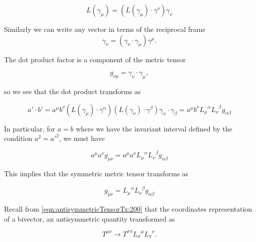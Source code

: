 \begin{equation}\label{eqn:antisymmetricTensorTx:330}
L(\gamma_\mu) = \left( L(\gamma_\mu) \cdot \gamma^\nu \right) \gamma_\nu
\end{equation}

Similarly we can write any vector in terms of the reciprocal frame
\begin{equation}\label{eqn:antisymmetricTensorTx:340}
\gamma_\nu = (\gamma_\nu \cdot \gamma_\mu) \gamma^\mu.
\end{equation}

The dot product factor is a component of the metric tensor

\begin{equation}\label{eqn:antisymmetricTensorTx:350}
g_{\nu \mu} = \gamma_\nu \cdot \gamma_\mu,
\end{equation}

so we see that the dot product transforms as

\begin{equation}\label{eqn:antisymmetricTensorTx:320b}
a' \cdot b' 
= a^\mu b^\nu 
( L(\gamma_\mu) \cdot \gamma^\alpha ) 
( L(\gamma_\nu) \cdot \gamma^\beta ) 
\gamma_\alpha
\cdot
\gamma_\beta
= a^\mu b^\nu 
{L_\mu}^\alpha
{L_\nu}^\beta
g_{\alpha \beta}
\end{equation}

In particular, for $a = b$ where we have the invariant interval defined by the condition $a^2 = {a'}^2$, we must have

\begin{equation}\label{eqn:antisymmetricTensorTx:360}
a^\mu a^\nu g_{\mu \nu}
= a^\mu a^\nu 
{L_\mu}^\alpha
{L_\nu}^\beta
g_{\alpha \beta}
\end{equation}

This implies that the symmetric metric tensor transforms as

\begin{equation}\label{eqn:antisymmetricTensorTx:370}
g_{\mu\nu}
=
{L_\mu}^\alpha
{L_\nu}^\beta
g_{\alpha \beta}
\end{equation}

Recall from \ref{eqn:antisymmetricTensorTx:200} that the coordinates representation of a bivector, an antisymmetric quantity transformed as

\begin{equation}\label{eqn:antisymmetricTensorTx:200b}
T^{\mu \nu} \rightarrow T^{\sigma \pi} {L_\sigma}^\mu {L_\pi}^\nu.
\end{equation}

